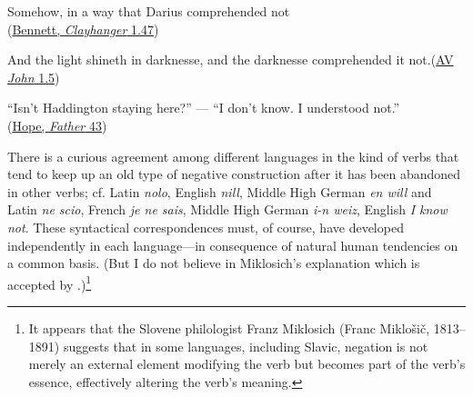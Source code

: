 \ea \label{ex:01-30}
Somehow, in a way that Darius comprehended not\\\hfill(\href{https://archive.org/details/clayhanger01benngoog/page/36/mode/2up?q=%22that+Darius%22&view=theater}{Bennett, \textit{Clayhanger} 1.47})
\z

\ea \label{ex:01-31} And the light shineth in darknesse, and the darknesse comprehended it not.\hfill(\href{https://archive.org/details/authorizedversio05wrig/page/200/mode/2up?q=%22And+the+light+shineth+in+darknesse%2C+and+the+darknesse+comprehended+it+not%22&view=theater}{AV \textit{John} 1.5})
\z

\ea \label{ex:01-32}
``Isn't Haddington staying here?'' --- ``I don't know. I understood not.''\\\hfill(\href{https://archive.org/details/fatherstafford00hope/page/78/mode/2up?q=%22+don%27t+know.+I+understood+not%22&view=theater}{Hope, \textit{Father} 43}) %
\z
{}

There is a curious agreement among different languages in the kind of verbs that tend to keep up an old type of negative construction after it has been abandoned in other verbs; cf. Latin \textit{nolo}, English \textit{nill}, Middle High German \textit{en will} and Latin \textit{ne scio}, French \textit{je ne sais}, Middle High German \textit{i-n weiz}, English \textit{I know not}. These syntactical correspondences must, of course, have developed independently in each language---in consequence of natural human tendencies on a common basis. (But I do not believe in Miklosich's explanation which is accepted by \citet[\href{https://archive.org/details/grundrissderver01delbgoog/page/522/mode/2up?view=theater&q=Miklosich}{523}]{delbruck1897vergleichende}.)\footnote{It appears that the Slovene philologist Franz Miklosich (Franc Miklošič, 1813--1891) suggests that in some languages, including Slavic, negation is not merely an external element modifying the verb but becomes part of the verb's essence, effectively altering the verb's meaning. \eds}

